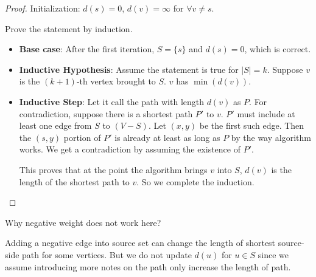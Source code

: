 \begin{proof}
	Initialization: $d(s) = 0$, $d(v) = \infty$ for $\forall v \neq s$.
	
	Prove the statement by induction.
	\begin{itemize}
		\item \textbf{Base case}: After the first iteration, $S = \{s\}$ and $d(s) = 0$, which is correct.
		\item \textbf{Inductive Hypothesis}: Assume the statement is true for $|S| = k$. Suppose $v$ is the $(k+1)$-th vertex brought to $S$. $v$ has $\min(d(v))$.
		\item \textbf{Inductive Step}: Let it call the path with length $d(v)$ as $P$. For contradiction, suppose there is a shortest path $P'$ to $v$. $P'$ must include at least one edge from $S$ to $(V-S)$. Let $(x, y)$ be the first such edge. Then the $(s, y)$ portion of $P'$ is already at least as long as $P$ by the way algorithm works. We get a contradiction by assuming the existence of $P'$.
		
		This proves that at the point the algorithm brings $v$ into $S$, $d(v)$ is the length of the shortest path to $v$. So we complete the induction.
	\end{itemize}
\end{proof}

Why negative weight does not work here?

Adding a negative edge into source set can change the length of shortest source-side path for some vertices. But we do not update $d(u)$ for $u \in S$ since we assume introducing more notes on the path only increase the length of path.
